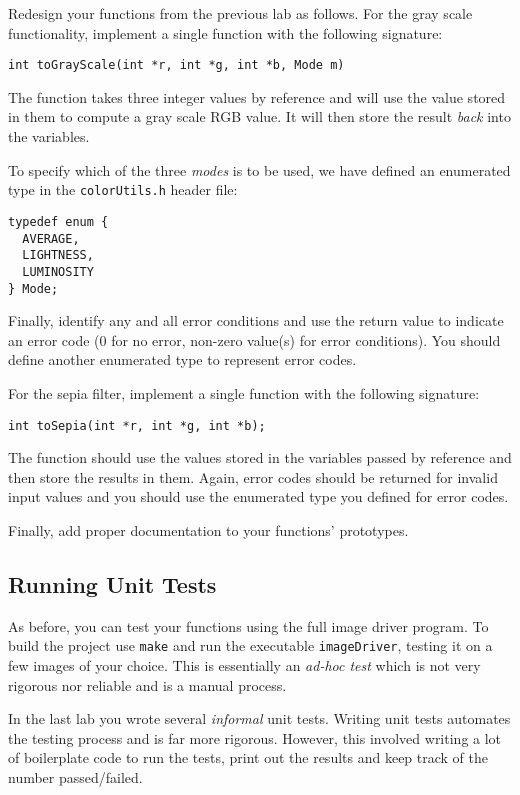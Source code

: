 \documentclass[12pt]{scrartcl}
\begin{document}
Redesign your functions from the previous lab as follows.  For 
the gray scale functionality, implement a single function with
the following signature:

\texttt{int toGrayScale(int *r, int *g, int *b, Mode m)}

The function takes three integer values by reference and will 
use the value stored in them to compute a gray scale RGB value.
It will then store the result \emph{back} into the variables.

To specify which of the three \emph{modes} is to be used, we have
defined an enumerated type in the \texttt{colorUtils.h}
header file:
\begin{verbatim}
typedef enum {
  AVERAGE,
  LIGHTNESS,
  LUMINOSITY
} Mode;
\end{verbatim}
Finally, identify any and all error conditions and use the return 
value to indicate an error code (0 for no error, non-zero value(s) 
for error conditions).  You should define another enumerated type
to represent error codes.

For the sepia filter, implement a single function with the following
signature:

\texttt{int toSepia(int *r, int *g, int *b);}

The function should use the values stored in the variables passed
by reference and then store the results in them.  Again, error codes
should be returned for invalid input values and you should use the
enumerated type you defined for error codes.

Finally, add proper documentation to your functions' prototypes.

\subsection{Running Unit Tests}

As before, you can test your functions using the full image driver
program.  To build the project use \texttt{make} and
run the executable \texttt{imageDriver}, testing it on
a few images of your choice.  This is essentially an 
\emph{ad-hoc test} which is not very rigorous nor reliable 
and is a manual process.  

In the last lab you wrote several \emph{informal} unit tests.  
Writing unit tests automates the testing process and is far more
rigorous.  However, this involved writing a lot of boilerplate 
code to run the tests, print out the results and keep track 
of the number passed/failed.  
\end{document}

